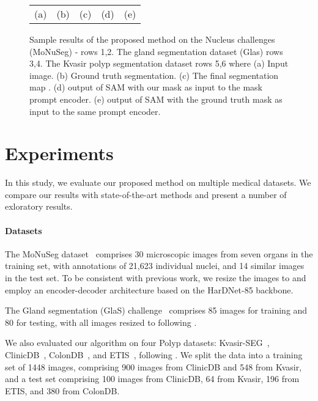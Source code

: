 \documentclass[runningheads]{llncs}
\begin{document}
\begin{figure}[htb!]
\begin{tabular}{ccccc}
    (a) & (b) & (c) & (d) & (e) 
    \end{tabular}
    \caption{Sample results of the proposed method on the Nucleus challenges (MoNuSeg) - rows 1,2. The gland segmentation dataset (Glas) rows 3,4. The Kvasir polyp segmentation dataset rows 5,6 where (a) Input image. (b) Ground truth segmentation. (c) The final segmentation map . (d) output of SAM with our mask as input to the mask prompt encoder. (e) output of SAM with the ground truth mask as input to the same prompt encoder.}
    \label{fig:Monu_seg}
\end{figure}


\section{Experiments}
\label{sec:experiments}

In this study, we evaluate our proposed method on multiple medical datasets. We compare our results with state-of-the-art methods and present a number of exloratory results. 



\paragraph{Datasets}
The MoNuSeg dataset~\cite{kumar2019multi} comprises 30 microscopic images from seven organs in the training set, with annotations of 21,623 individual nuclei, and 14 similar images in the test set. To be consistent with previous work, we resize the images to \cite{valanarasu2021medical} and employ an encoder-decoder architecture based on the HarDNet-85\cite{chao2019hardnet} backbone. 

The Gland segmentation (GlaS) challenge~\cite{sirinukunwattana2017gland} comprises 85 images for training and 80 for testing, with all images resized to  following \cite{wang2021uctransnet}. 

We also evaluated our algorithm on four Polyp datasets: Kvasir-SEG~\cite{jha2020kvasir}, ClinicDB~\cite{bernal2015wm}, ColonDB~\cite{tajbakhsh2015automated}, and ETIS~\cite{silva2014toward}, following \cite{fan2020pranet}. We split the data into a training set of 1448 images, comprising 900 images from ClinicDB and 548 from Kvasir, and a test set comprising 100 images from ClinicDB, 64 from Kvasir, 196 from ETIS, and 380 from ColonDB. 
\end{document}

